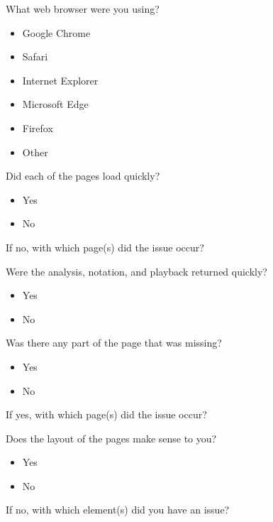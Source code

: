 \noindent What web browser were you using?

\begin{itemize}
	\item Google Chrome
	\item Safari
	\item Internet Explorer
	\item Microsoft Edge
	\item Firefox
	\item Other
\end{itemize}

\noindent Did each of the pages load quickly?

\begin{itemize}
	\item Yes
	\item No
\end{itemize}

\noindent If no, with which page(s) did the issue occur?

\vspace{\baselineskip}

\noindent Were the analysis, notation, and playback returned quickly?

\begin{itemize}
	\item Yes
	\item No
\end{itemize}

\noindent Was there any part of the page that was missing?

\begin{itemize}
	\item Yes
	\item No
\end{itemize}

\noindent If yes, with which page(s) did the issue occur?

\vspace{\baselineskip}

\noindent Does the layout of the pages make sense to you?

\begin{itemize}
	\item Yes
	\item No
\end{itemize}

\noindent If no, with which element(s) did you have an issue?

\vspace{\baselineskip}

